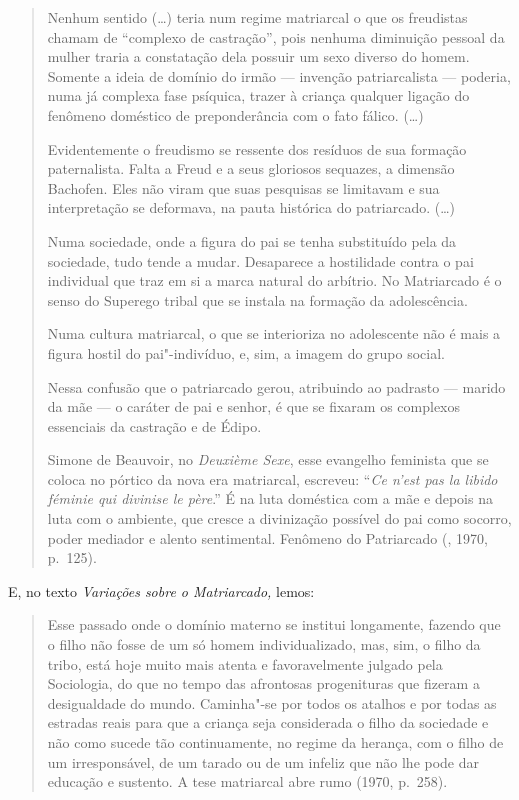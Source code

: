 \begin{quote}
Nenhum sentido (\ldots{}) teria num regime matriarcal o que os freudistas
chamam de ``complexo de castração'', pois nenhuma diminuição pessoal da
mulher traria a constatação dela possuir um sexo diverso do homem.
Somente a ideia de domínio do irmão --- invenção patriarcalista ---
poderia, numa já complexa fase psíquica, trazer à criança qualquer
ligação do fenômeno doméstico de preponderância com o fato fálico. (\ldots{})

Evidentemente o freudismo se ressente dos resíduos de sua formação
paternalista. Falta a Freud e a seus gloriosos sequazes, a dimensão
Bachofen. Eles não viram que suas pesquisas se limitavam e sua
interpretação se deformava, na pauta histórica do patriarcado. (\ldots{})

Numa sociedade, onde a figura do pai se tenha substituído pela da
sociedade, tudo tende a mudar. Desaparece a hostilidade contra o pai
individual que traz em si a marca natural do arbítrio. No Matriarcado é
o senso do Superego tribal que se instala na formação da adolescência.

Numa cultura matriarcal, o que se interioriza no adolescente não é mais
a figura hostil do pai"-indivíduo, e, sim, a imagem do grupo social.

Nessa confusão que o patriarcado gerou, atribuindo ao padrasto --- marido
da mãe --- o caráter de pai e senhor, é que se fixaram os complexos
essenciais da castração e de Édipo.

Simone de Beauvoir, no \emph{Deuxième Sexe}, esse evangelho feminista
que se coloca no pórtico da nova era matriarcal, escreveu: ``\emph{Ce
n'est pas la libido féminie qui divinise le père}.'' É na luta doméstica
com a mãe e depois na luta com o ambiente, que cresce a divinização
possível do pai como socorro, poder mediador e alento sentimental.
Fenômeno do Patriarcado (, 1970, p.~125).
\end{quote}

E, no texto \emph{Variações sobre o Matriarcado,} lemos:

\begin{quote}
Esse passado onde o domínio materno se institui longamente, fazendo que
o filho não fosse de um só homem individualizado, mas, sim, o filho da
tribo, está hoje muito mais atenta e favoravelmente julgado pela
Sociologia, do que no tempo das afrontosas progenituras que fizeram a
desigualdade do mundo. Caminha"-se por todos os atalhos e por todas as
estradas reais para que a criança seja considerada o filho da sociedade
e não como sucede tão continuamente, no regime da herança, com o filho
de um irresponsável, de um tarado ou de um infeliz que não lhe pode dar
educação e sustento. A tese matriarcal abre rumo (1970, p.~258).
\end{quote}

